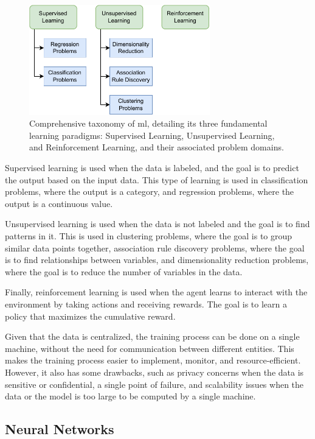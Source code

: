 \begin{figure}[ht]
    \centering
    \includegraphics[width=0.7\textwidth]{figs/ml_types.pdf}
    \caption[Overview of \ac{ml} Learning Paradigms]{Comprehensive taxonomy of \ac{ml}, detailing its three fundamental learning paradigms: Supervised Learning, Unsupervised Learning, and Reinforcement Learning, and their associated problem domains.}
    \label{fig:ml_types}
\end{figure}

Supervised learning is used when the data is labeled, and the goal is to predict the output based on the input data. This type of learning is used in classification problems, where the output is a category, and regression problems, where the output is a continuous value. 

Unsupervised learning is used when the data is not labeled and the goal is to find patterns in it. This is used in clustering problems, where the goal is to group similar data points together, association rule discovery problems, where the goal is to find relationships between variables, and dimensionality reduction problems, where the goal is to reduce the number of variables in the data.

Finally, reinforcement learning is used when the agent learns to interact with the environment by taking actions and receiving rewards. The goal is to learn a policy that maximizes the cumulative reward.

Given that the data is centralized, the training process can be done on a single machine, without the need for communication between different entities. This makes the training process easier to implement, monitor, and resource-efficient. However, it also has some drawbacks, such as privacy concerns when the data is sensitive or confidential, a single point of failure, and scalability issues when the data or the model is too large to be computed by a single machine.

\subsection{Neural Networks}
\label{sec:neural-networks}

